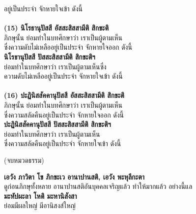 \documentclass[12pt]{article}
\begin{document}
\indent อยู่เป็นประจำ จักหายใจเข้า ดังนี้\\
\\
\textbf{(15) นิโรธานุปัสสี อัสสะสิสสามีติ สิกขะติ}\\
\indent ภิกษุนั้น ย่อมทำในบทศึกษาว่า เราเป็นผู้ตามเห็น\\
\indent ซึ่งความดับไม่เหลืออยู่เป็นประจำ จักหายใจออก ดังนี้\\
\textbf{นิโรธานุปัสสี ปัสสะสิสสามีติ สิกขะติฯ}\\
\indent ย่อมทำในบทศึกษาว่า เราเป็นผู้ตามเห็นซึ่ง\\
\indent ความดับไม่เหลืออยู่เป็นประจำ จักหายใจเข้า ดังนี้\\
\\
\textbf{(16) ปะฏินิสสัคคานุปัสสี อัสสะสิสสามีติ สิกขะติ}\\
\indent ภิกษุนั้น ย่อมทำในบทศึกษาว่า เราเป็นผู้ตามเห็น\\
\indent ซึ่งความสลัดคืนอยู่เป็นประจำ จักหายใจออก ดังนี้\\
\textbf{ปะฏินิสสัคคานุปัสสี ปัสสะสิสสามีติ สิกขะติฯ}\\
\indent ย่อมทำในบทศึกษาว่า เราเป็นผู้ตามเห็น\\
\indent ซึ่งความสลัดคืนอยู่เป็นประจำ จักหายใจเข้า ดังนี้
\begin{center}
(จบหมวดธรรม)
\end{center}
\textbf{เอวัง ภาวิตา โข ภิกขะเว อานาปานสติ, เอวัง พะหุลีกะตา}\\
\indent ดูก่อนภิกษุทั้งหลาย อานาปานสติอันบุคคลเจริญแล้ว ทำให้มากแล้ว อย่างนี้แล\\
\textbf{มะหัปผะลา โหติ มะหานิสังสา}\\
\indent ย่อมมีผลใหญ่ มีอานิสงส์ใหญ่\\

\pagebreak
\end{document}
